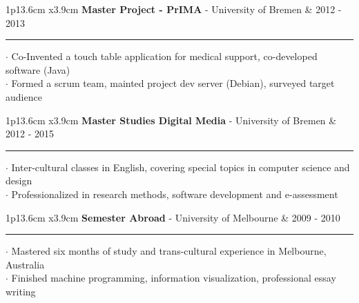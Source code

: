 \documentclass[10pt,A4]{article}
\newcommand{\cvevent}[5]
{

\begin{tabular*}{1\textwidth}{p{13.6cm}  x{3.9cm}}
	\textbf{#2} - \textcolor{bgcol}{#3} &   \vspace{2.5pt}\textcolor{sectcol}{#1}
\end{tabular*}

\vspace{-8pt}
\textcolor{softcol}{\hrule}
\vspace{6pt}

  $\cdot$ #4\\[3pt]
  $\cdot$ #5\\[6pt]

}
\newcommand{\mystrut}{\rule[-.3\baselineskip]{0pt}{\baselineskip}}
\begin{document}

%
\cvevent{2012 - 2013}{Master Project - PrIMA}{University of Bremen}{Co-Invented a touch table application for medical support, co-developed software (Java) }{Formed a scrum team, mainted project dev server (Debian), surveyed target audience}


%
\cvevent{2012 - 2015}{Master Studies Digital Media}{University of Bremen}{Inter-cultural classes in English, covering special topics in computer science and design}{Professionalized in research methods, software development and e-assessment}


%
\cvevent{2009 - 2010}{Semester Abroad}{University of Melbourne}{Mastered six months of study and trans-cultural experience in Melbourne, Australia}{Finished machine programming, information visualization, professional essay writing}



\null
\vspace*{\fill}
\hspace{-0.25\linewidth}\colorbox{white}{\makebox[1.5\linewidth][c]{\mystrut  \textnormal{\textcolor{sectcol}{www.jankuester.com} $\cdot$ \textcolor{sectcol}{github.com/jankapunkt}}}}




%
%
%
%
%
%
\end{document}
